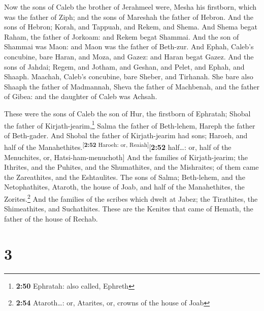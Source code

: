  Now the sons of Caleb the brother of Jerahmeel were,
Mesha his firstborn, which was the father of Ziph; and the sons of
Mareshah the father of Hebron.  And the sons of Hebron;
Korah, and Tappuah, and Rekem, and Shema.  And Shema
begat Raham, the father of Jorkoam: and Rekem begat Shammai.
 And the son of Shammai was Maon: and Maon was the father
of Beth-zur.  And Ephah, Caleb's concubine, bare Haran,
and Moza, and Gazez: and Haran begat Gazez.  And the sons
of Jahdai; Regem, and Jotham, and Geshan, and Pelet, and Ephah, and
Shaaph.  Maachah, Caleb's concubine, bare Sheber, and
Tirhanah.  She bare also Shaaph the father of Madmannah,
Sheva the father of Machbenah, and the father of Gibea: and the daughter
of Caleb was Achsah.

 These were the sons of Caleb the son of Hur, the
firstborn of Ephratah; Shobal the father of Kirjath-jearim,\footnote{\textbf{2:50}
  Ephratah: also called, Ephreth}  Salma the father of
Beth-lehem, Hareph the father of Beth-gader.  And Shobal
the father of Kirjath-jearim had sons; Haroeh, and half of the
Manahethites.\textsuperscript{{[}\textbf{2:52} Haroeh: or,
Reaiah{]}}{[}\textbf{2:52} half\ldots: or, half of the Menuchites, or,
Hatsi-ham-menuchoth{]}  And the families of
Kirjath-jearim; the Ithrites, and the Puhites, and the Shumathites, and
the Mishraites; of them came the Zareathites, and the Eshtaulites.
 The sons of Salma; Beth-lehem, and the Netophathites,
Ataroth, the house of Joab, and half of the Manahethites, the
Zorites.\footnote{\textbf{2:54} Ataroth\ldots: or, Atarites, or, crowns
  of the house of Joab}  And the families of the scribes
which dwelt at Jabez; the Tirathites, the Shimeathites, and Suchathites.
These are the Kenites that came of Hemath, the father of the house of
Rechab.

\hypertarget{section-2}{%
\section{3}\label{section-2}}

